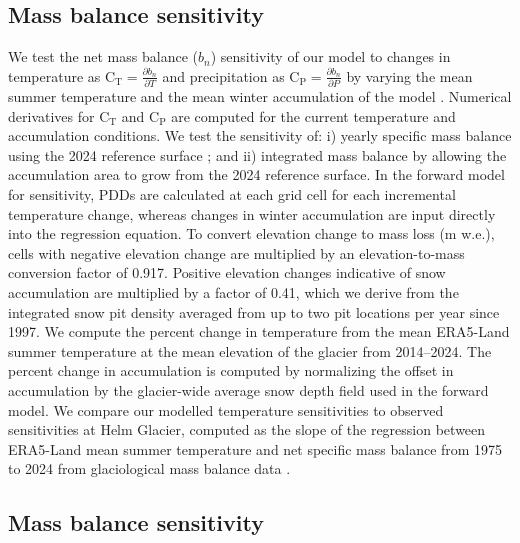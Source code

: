 \documentclass[annals,review,oneside]{igs}
\begin{document}
\subsection{Mass balance sensitivity}
We test the net mass balance ($b_n$) sensitivity of our model to changes in temperature as $\mathrm{C_T} = \frac{\partial b_n}{\partial T}$ and precipitation as $\mathrm{C_P} = \frac{\partial b_n}{\partial P}$ by varying the mean summer temperature and the mean winter accumulation of the model  \citep[e.g.][]{Cuffey2010}. Numerical derivatives for $\mathrm{C_T}$ and $\mathrm{C_P}$ are computed for the current temperature and accumulation conditions. We test the sensitivity of: i) yearly specific mass balance using the 2024 reference surface \citep[e.g.][]{Elsberg2001}; and ii) integrated mass balance by allowing the accumulation area to grow from the 2024 reference surface. In the forward model for sensitivity, PDDs are calculated at each grid cell for each incremental temperature change, whereas changes in winter accumulation are input directly into the regression equation. To convert elevation change to mass loss (m w.e.), cells with negative elevation change are multiplied by an elevation-to-mass conversion factor of 0.917. Positive elevation changes indicative of snow accumulation are multiplied by a factor of 0.41, which we derive from the integrated snow pit density averaged from up to two pit locations per year since 1997.  We compute the percent change in temperature from the mean ERA5-Land summer temperature at the mean elevation of the glacier from 2014--2024. The percent change in accumulation is computed by normalizing the offset in accumulation by the glacier-wide average snow depth field used in the forward model. We compare our modelled temperature sensitivities to observed sensitivities at Helm Glacier, computed as the slope of the regression between ERA5-Land mean summer temperature and net specific mass balance from 1975 to 2024 from glaciological mass balance data \citep{WGMS2024}.

\subsection{Mass balance sensitivity}
\end{document}
